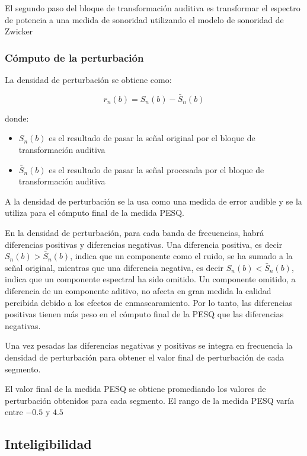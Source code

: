 El segundo paso del bloque de transformación auditiva es transformar el espectro de potencia a una medida de sonoridad utilizando el modelo de sonoridad de Zwicker \cite{a_revision_of_zwicker_s_loudness_model}

\subsubsection{Cómputo de la perturbación}

La densidad de perturbación se obtiene como:

\begin{equation*}
	r_n(b) = S_n(b) - \bar{S}_n(b)
\end{equation*}

donde:

\begin{itemize}
	\item $S_n(b)$ es el resultado de pasar la señal original por el bloque de transformación auditiva
	\item $\bar{S}_n(b)$ es el resultado de pasar la señal procesada por el bloque de transformación auditiva
\end{itemize}

A la densidad de perturbación se la usa como una medida de error audible y se la utiliza para el cómputo final de la medida PESQ.

En la densidad de perturbación, para cada banda de frecuencias, habrá diferencias positivas y diferencias negativas. Una diferencia positiva, es decir $S_n(b) > \bar{S}_n(b)$, indica que un componente como el ruido, se ha sumado a la señal original, mientras que una diferencia negativa, es decir $S_n(b) < \bar{S}_n(b)$, indica que un componente espectral ha sido omitido. Un componente omitido, a diferencia de un componente aditivo, no afecta en gran medida la calidad percibida debido a los efectos de enmascaramiento. Por lo tanto, las diferencias positivas tienen más peso en el cómputo final de la PESQ que las diferencias negativas.

Una vez pesadas las diferencias negativas y positivas se integra en frecuencia la densidad de perturbación para obtener el valor final de perturbación de cada segmento.

El valor final de la medida PESQ se obtiene promediando los valores de perturbación obtenidos para cada segmento. El rango de la medida PESQ varía entre $-0.5$ y $4.5$

\subsection{Inteligibilidad}

